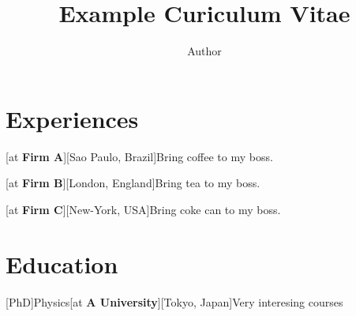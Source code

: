 \documentclass[a4paper]{arthur-cv}
\title{Example Curiculum Vitae}
\author{Author}
\begin{document}
  \makeprofile %

  \begin{cvbody}

    \begin{cvleft}










    \end{cvleft}
    \begin{cvright}


      \section{Experiences}
        \begin{rightenv}
          [at \textbf{Firm A}][Sao Paulo, Brazil]{Bring coffee to my boss.}

          [at \textbf{Firm B}][London, England]{Bring tea to my boss.}

          [at \textbf{Firm C}][New-York, USA]{Bring coke can to my boss.}
        \end{rightenv}

      \section{Education}
        \begin{rightenv}
          [PhD]{Physics}[at \textbf{A University}][Tokyo, Japan]{Very interesing courses}


\end{rightenv}
\end{cvright}
\end{cvbody}
\end{document}
